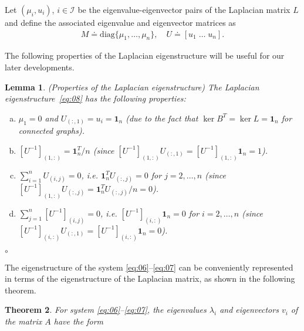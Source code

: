 \documentclass[letter, 10pt, conference]{ieeeconf}
\newtheorem{theorem}{Theorem}[section]
\newtheorem{lemma}[theorem]{Lemma}
\newcommand{\diag}{\mathrm{diag}}
\newcommand{\mer}{\hfill$\circ$}
\newcommand{\1}{\mathbf{1}}
\newcommand{\0}{\mathbf{0}}
\begin{document}
{Let $(\mu_i,u_i)$, $i\in \mathcal{I}$ be the eigenvalue-eigenvector
pairs of the Laplacian matrix $L$ and define the associated eigenvalue
and eigenvector matrices as
\begin{align}
	\label{eq:08}
	M \doteq \diag \{\mu_1, \dots, \mu_n\}, \quad
U \doteq [u_1\; \dots \; u_n].
\end{align}

The following properties of the Laplacian eigenstructure will
be useful for our later developments.

\begin{lemma}(\emph{Properties of the Laplacian eigenstructure})
  \label{lem:Wprop}
  The Laplacian eigenstructure~\eqref{eq:08} has the
  following properties:
  \begin{enumerate}[(a)]
  \item \label{item1} $\mu_1=0$ and $U_{(:,1)}=u_i=\1_n$ (due to the
    fact that $\ker B^T = \ker L = \1_n$ for connected graphs).
  	\item \label{item2} $[U^{-1}]_{(1,:)}=\1_n^T/n $ (since 
  			$[U^{-1}]_{(1,:)} U_{(:,1)}=[U^{-1}]_{(1,:)} \1_n = 1$).
  	\item \label{item3} $\sum_{i=1}^n U_{(i,j)}=0$, i.e. 
  			$\1_n^T U_{(:,j)}=0$ for $j=2,\dots,n$ (since 
  			$[U^{-1}]_{(1,:)} U_{(:,j)}=\1_n^T U_{(:,j)}/n = 0$).
    \item \label{item4} $\sum_{j=1}^n [U^{-1}]_{(i,j)}=0$, i.e.  
    		$[U^{-1}]_{(i,:)} \1_n =0$ for $i=2,\dots,n$ (since
            $[U^{-1}]_{(i,:)} U_{(:,1)}=[U^{-1}]_{(i,:)}\1_n =0$).
  \end{enumerate}
  \mer
\end{lemma}

The eigenstructure of the system \eqref{eq:06}--\eqref{eq:07} can be
conveniently represented in terms of the eigenstructure of the
Laplacian matrix, as shown in the following theorem.
\begin{theorem}
  \label{thm:A_eigen}
  For system \eqref{eq:06}--\eqref{eq:07}, the eigenvalues $\lambda_i$
  and eigenvectors $v_i$ of the matrix $A$ have the form
  

\end{theorem}}
\end{document}
